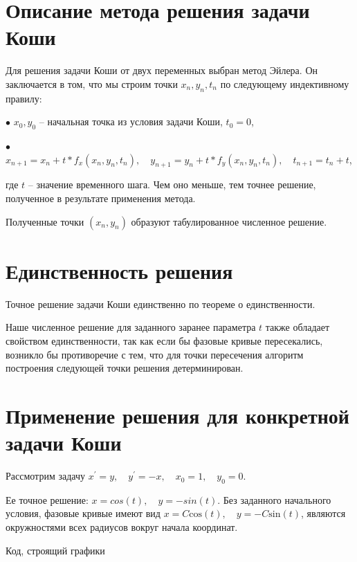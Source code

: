 \documentclass[12pt,reqno]{amsart}
\theoremstyle{definition}
\theoremstyle{remark}
\begin{document}
\section*{Описание метода решения задачи Коши}

Для решения задачи Коши от двух переменных выбран метод Эйлера. Он заключается в том, что мы строим точки $x_n, y_n, t_n$ по следующему индективному правилу:

 $\bullet$ $x_0, y_0$ -- начальная точка из условия задачи Коши, $t_0 = 0$,

 $\bullet$ $x_{n + 1} = x_n + t * f_x(x_n, y_n, t_n),\quad y_{n + 1} = y_n + t * f_y(x_n, y_n, t_n), \quad t_{n+1} = t_n + t$,

где $t$ -- значение временного шага. Чем оно меньше, тем точнее решение, полученное в результате применения метода.

Полученные точки $(x_n, y_n)$ образуют табулированное численное решение.

\section*{Единственность решения}

Точное решение задачи Коши единственно по теореме о единственности.

Наше численное решение для заданного заранее параметра $t$ также обладает свойством единственности, так как если бы фазовые кривые пересекались, возникло бы противоречие с тем, что для точки пересечения алгоритм построения следующей точки решения детерминирован.

\section*{Применение решения для конкретной задачи Коши}

Рассмотрим задачу $x^\prime = y,\quad y^\prime = -x, \quad x_0 = 1, \quad y_0 = 0$.

Ее точное решение: $x = cos(t), \quad y = -sin(t)$. Без заданного начального условия, фазовые кривые имеют вид $x = C \mathrm{cos}(t), \quad y = -C \mathrm{sin}(t)$, являются окружностями всех радиусов вокруг начала координат.

Код, строящий графики
\end{document}
